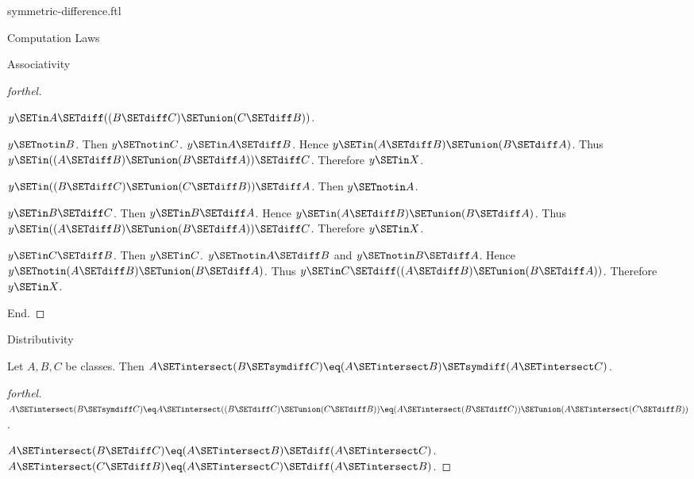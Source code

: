 \documentclass{stex}
\begin{document}
\begin{smodule}{symmetric-difference.ftl}
\begin{sfragment}{Computation Laws}
\begin{sfragment}{Associativity}
\begin{proof}[forthel]
\begin{case}{$y \SETin A \SETdiff ((B \SETdiff C) \SETunion (C \SETdiff B))$.}
          \begin{case}{$y \SETnotin B$.}
            Then $y \SETnotin C$.
            $y \SETin A \SETdiff B$.
            Hence $y \SETin (A \SETdiff B) \SETunion (B \SETdiff A)$.
            Thus $y \SETin ((A \SETdiff B) \SETunion (B \SETdiff A)) \SETdiff C$.
            Therefore $y \SETin X$.
          \end{case}
        \end{case}

        \begin{case}{$y \SETin ((B \SETdiff C) \SETunion (C \SETdiff B)) \SETdiff A$.}
          Then $y \SETnotin A$.

          \begin{case}{$y \SETin B \SETdiff C$.}
            Then $y \SETin B \SETdiff A$.
            Hence $y \SETin (A \SETdiff B) \SETunion (B \SETdiff A)$.
            Thus $y \SETin ((A \SETdiff B) \SETunion (B \SETdiff A)) \SETdiff C$.
            Therefore $y \SETin X$.
          \end{case}

          \begin{case}{$y \SETin C \SETdiff B$.}
            Then $y \SETin C$.
            $y \SETnotin A \SETdiff B$ and $y \SETnotin B \SETdiff A$.
            Hence $y \SETnotin (A \SETdiff B) \SETunion (B \SETdiff A)$.
            Thus $y \SETin C \SETdiff ((A \SETdiff B) \SETunion (B \SETdiff A))$.
            Therefore $y \SETin X$.
          \end{case}
        \end{case}
      End.
    \end{proof}
  \end{sfragment}

  \begin{sfragment}{Distributivity}
    \begin{proposition}[forthel,id=FOUNDATIONS_03_4119141910839296]
      Let $A, B, C$ be classes.
      Then $A \SETintersect (B \SETsymdiff C) \eq (A \SETintersect B) \SETsymdiff (A \SETintersect C)$.
    \end{proposition}
    \begin{proof}[forthel]
      $A \SETintersect (B \SETsymdiff C)
        \eq A \SETintersect ((B \SETdiff C) \SETunion (C \SETdiff B))
        \eq (A \SETintersect (B \SETdiff C)) \SETunion (A \SETintersect (C \SETdiff B))$.

      $A \SETintersect (B \SETdiff C) \eq (A \SETintersect B) \SETdiff (A \SETintersect C)$.
      $A \SETintersect (C \SETdiff B) \eq (A \SETintersect C) \SETdiff (A \SETintersect B)$.


\end{proof}
\end{sfragment}
\end{sfragment}
\end{smodule}
\end{document}
